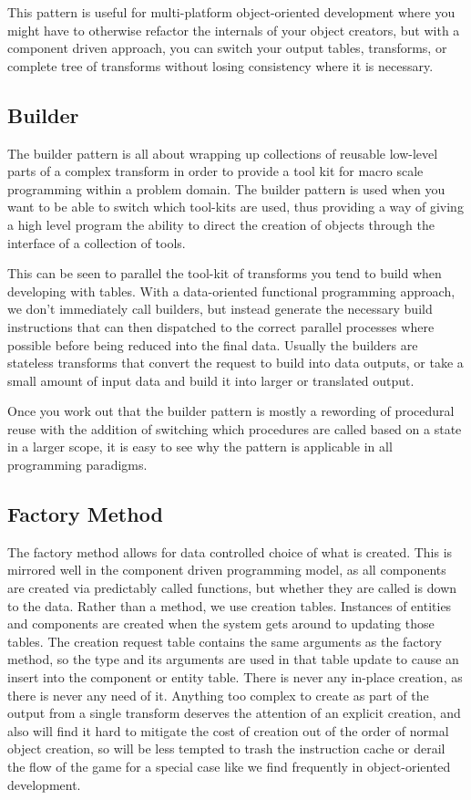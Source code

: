 This pattern is useful for multi-platform object-oriented development where you
might have to otherwise refactor the internals of your object creators, but
with a component driven approach, you can switch your output tables,
transforms, or complete tree of transforms without losing consistency where it
is necessary.

\subsection{Builder}

The builder pattern is all about wrapping up collections of reusable low-level
parts of a complex transform in order to provide a tool kit for macro scale
programming within a problem domain. The builder pattern is used when you want
to be able to switch which tool-kits are used, thus providing a way of giving a
high level program the ability to direct the creation of objects through the
interface of a collection of tools.

This can be seen to parallel the tool-kit of transforms you tend to build when
developing with tables. With a data-oriented functional programming approach,
we don't immediately call builders, but instead generate the necessary build
instructions that can then dispatched to the correct parallel processes where
possible before being reduced into the final data. Usually the builders are
stateless transforms that convert the request to build into data outputs, or
take a small amount of input data and build it into larger or translated
output.

Once you work out that the builder pattern is mostly a rewording of procedural
reuse with the addition of switching which procedures are called based on a
state in a larger scope, it is easy to see why the pattern is applicable in all
programming paradigms.

\subsection{Factory Method}

The factory method allows for data controlled choice of what is created. This
is mirrored well in the component driven programming model, as all components
are created via predictably called functions, but whether they are called is
down to the data. Rather than a method, we use creation tables. Instances of
entities and components are created when the system gets around to updating
those tables. The creation request table contains the same arguments as the
factory method, so the type and its arguments are used in that table update to
cause an insert into the component or entity table. There is never any in-place
creation, as there is never any need of it. Anything too complex to create as
part of the output from a single transform deserves the attention of an
explicit creation, and also will find it hard to mitigate the cost of creation
out of the order of normal object creation, so will be less tempted to trash
the instruction cache or derail the flow of the game for a special case like we
find frequently in object-oriented development.

